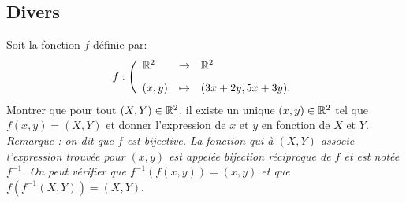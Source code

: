 \documentclass[a4paper, 11pt,reqno]{article}
\begin{document}
\vspace{0.5cm}
 
\noindent  \subsection*{Divers}
\vspace{0.2cm}


\begin{exercice}  \;
Soit la fonction $f$ d\'efinie par: 
$$f : \left( \begin{array}{llll}
\R^{2} & \rightarrow & \R^2\vsec\\
(x,y) & \mapsto & (3x+2y, 5x+3y). 
 \end{array}\right.
$$
Montrer que pour tout $(X,Y) \in \mathbb{R}^2$, il existe un unique $(x,y) \in \mathbb{R}^2$ tel que $f(x,y) = (X,Y)$ et donner l'expression de $x$ et $y$ en fonction de $X$ et $Y$.\vsec\\
\textit{Remarque : on dit que $f$ est bijective. La fonction qui \`a $(X,Y)$ associe l'expression trouv\'ee pour $(x,y)$ est appel\'ee bijection r\'eciproque de $f$ et est not\'ee $f^{-1}$. On peut v\'erifier que $f^{-1}(f(x,y)) = (x,y)$ et que $f(f^{-1}(X,Y)) = (X,Y)$}.
\end{exercice}
\end{document}
